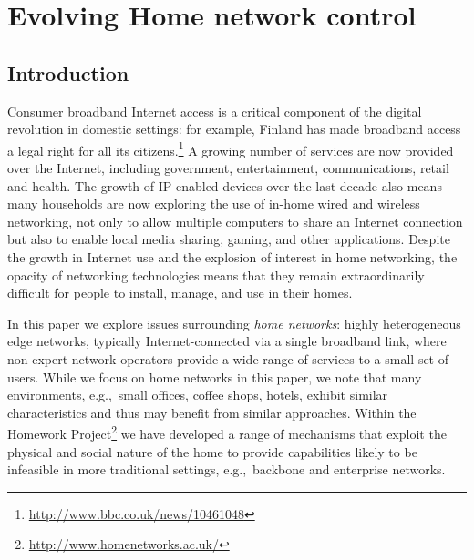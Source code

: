 


\chapter{Evolving Home network control}
\ifpdf
    \graphicspath{{Chapter2/Chapter2Figs/PNG/}{Chapter2/Chapter2Figs/PDF/}{Chapter2/Chapter2Figs/}}
\else
    \graphicspath{{Chapter2/Chapter2Figs/EPS/}{Chapter2/Chapter2Figs/}}
\fi
\section{Introduction}
\label{s:intro}

Consumer broadband Internet access is a critical component of the
digital revolution in domestic settings: for example, Finland has made
broadband access a legal right for all its
citizens.\footnote{\url{http://www.bbc.co.uk/news/10461048}} A growing
number of services are now provided over the Internet, including
government, entertainment, communications, retail and health.  The
growth of IP enabled devices over the last decade also means many
households are now exploring the use of in-home wired and wireless
networking, not only to allow multiple computers to share an Internet
connection but also to enable local media sharing, gaming, and other
applications.  Despite the growth in Internet use and the explosion of
interest in home networking, the opacity of networking technologies
means that they remain extraordinarily difficult for people to install,
manage, and use in their homes.


In this paper we explore issues surrounding \emph{home networks}:
highly heterogeneous edge networks, typically Internet-connected via a
single broadband link, where non-expert network operators provide a
wide range of services to a small set of users.  While we focus on
home networks in this paper, we note that many environments,
e.g.,~small offices, coffee shops, hotels, exhibit similar 
characteristics and thus may benefit from similar approaches.  Within
the Homework Project\footnote{\url{http://www.homenetworks.ac.uk/}} we
have developed a range of mechanisms that exploit the physical and
social nature of the home to provide capabilities likely to be
infeasible in more traditional settings, e.g.,~backbone and enterprise
networks. 

